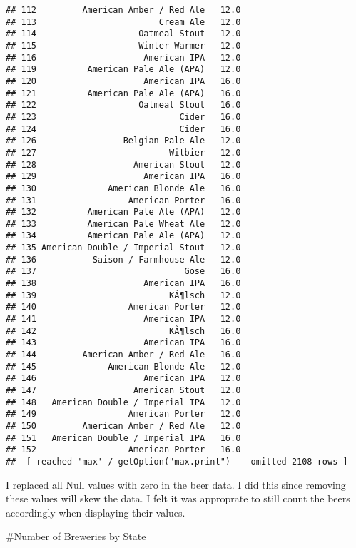 \documentclass[
]{article}
\newenvironment{Shaded}{\begin{snugshade}}{\end{snugshade}}
\newcommand{\KeywordTok}[1]{\textcolor[rgb]{0.13,0.29,0.53}{\textbf{#1}}}
\newcommand{\NormalTok}[1]{#1}
\newcommand{\OperatorTok}[1]{\textcolor[rgb]{0.81,0.36,0.00}{\textbf{#1}}}
\newcommand{\StringTok}[1]{\textcolor[rgb]{0.31,0.60,0.02}{#1}}
\begin{document}
\begin{verbatim}
## 112         American Amber / Red Ale   12.0
## 113                        Cream Ale   12.0
## 114                    Oatmeal Stout   12.0
## 115                    Winter Warmer   12.0
## 116                     American IPA   12.0
## 119          American Pale Ale (APA)   12.0
## 120                     American IPA   16.0
## 121          American Pale Ale (APA)   16.0
## 122                    Oatmeal Stout   16.0
## 123                            Cider   16.0
## 124                            Cider   16.0
## 126                 Belgian Pale Ale   12.0
## 127                          Witbier   12.0
## 128                   American Stout   12.0
## 129                     American IPA   16.0
## 130              American Blonde Ale   16.0
## 131                  American Porter   16.0
## 132          American Pale Ale (APA)   12.0
## 133          American Pale Wheat Ale   12.0
## 134          American Pale Ale (APA)   12.0
## 135 American Double / Imperial Stout   12.0
## 136           Saison / Farmhouse Ale   12.0
## 137                             Gose   16.0
## 138                     American IPA   16.0
## 139                          KÃ¶lsch   12.0
## 140                  American Porter   12.0
## 141                     American IPA   12.0
## 142                          KÃ¶lsch   16.0
## 143                     American IPA   16.0
## 144         American Amber / Red Ale   16.0
## 145              American Blonde Ale   12.0
## 146                     American IPA   12.0
## 147                   American Stout   12.0
## 148   American Double / Imperial IPA   12.0
## 149                  American Porter   12.0
## 150         American Amber / Red Ale   12.0
## 151   American Double / Imperial IPA   16.0
## 152                  American Porter   16.0
##  [ reached 'max' / getOption("max.print") -- omitted 2108 rows ]
\end{verbatim}

I replaced all Null values with zero in the beer data. I did this since
removing these values will skew the data. I felt it was approprate to
still count the beers accordingly when displaying their values.

\#Number of Breweries by State

\begin{Shaded}
\end{Shaded}
\end{document}
